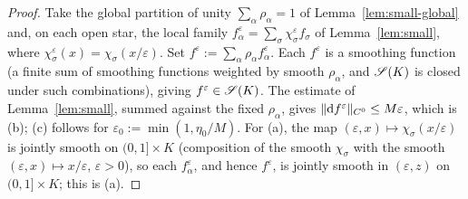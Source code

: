 \begin{proof}
Take the global partition of unity $\sum_\alpha\rho_\alpha=1$ of
Lemma~\ref{lem:small-global} and, on each open star, the local family
$f_\alpha^\varepsilon=\sum_\sigma\chi_\sigma^\varepsilon f_\sigma$ of
Lemma~\ref{lem:small}, where $\chi_\sigma^\varepsilon(x)=\chi_\sigma(x/\varepsilon)$.
Set $f^\varepsilon:=\sum_\alpha\rho_\alpha f_\alpha^\varepsilon$. Each
$f^\varepsilon$ is a smoothing function (a finite sum of smoothing functions
weighted by smooth $\rho_\alpha$, and $\mathscr S(K)$ is closed under such
combinations), giving $f^\varepsilon\in\mathscr S(K)$. The estimate of
Lemma~\ref{lem:small}, summed against the fixed $\rho_\alpha$, gives
$\|\mathrm d f^\varepsilon\|_{C^0}\le M\varepsilon$, which is (b); (c) follows for
$\varepsilon_0:=\min(1,\eta_0/M)$. For (a), the map $(\varepsilon,x)\mapsto
\chi_\sigma(x/\varepsilon)$ is jointly smooth on $(0,1]\times K$ (composition of
the smooth $\chi_\sigma$ with the smooth $(\varepsilon,x)\mapsto x/\varepsilon$,
$\varepsilon>0$), so each $f_\alpha^\varepsilon$, and hence $f^\varepsilon$, is
jointly smooth in $(\varepsilon,z)$ on $(0,1]\times K$; this is (a).
\end{proof}

